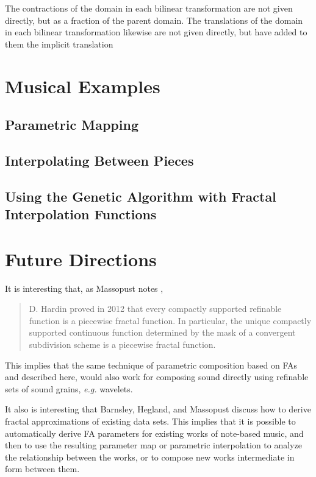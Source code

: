 \documentclass[english,11pt,letterpaper,onecolumn]{scrartcl}
\numberwithin{equation}{section}
\begin{document}
The contractions of the domain in each bilinear transformation are not given directly, but as a fraction of the
parent domain. The translations of the domain in each bilinear transformation likewise are not given directly,
but have added to them the implicit translation

\section{Musical Examples}

\subsection{Parametric Mapping}


\subsection{Interpolating Between Pieces}


\subsection{Using the Genetic Algorithm with Fractal Interpolation
Functions}

\section{Future Directions}

It is interesting that, as Massopust notes \cite{massopust2017},
\begin{quote}D. Hardin proved in 2012 that every compactly supported
refinable function is a piecewise fractal function. In particular, the
unique
compactly supported continuous function determined by the mask of a
convergent
subdivision scheme is a piecewise fractal function. \end{quote}
This implies that the same technique of parametric
composition based on FAs and described here, would also work for composing
sound directly using refinable sets of sound grains, \textit{e.g.}
wavelets.

It also is interesting that Barnsley, Hegland, and Massopust
\cite{2013arXiv1309.0972B} discuss how to derive fractal approximations of
existing data sets. This implies that it is possible to automatically
derive
FA parameters for existing works of note-based music, and then to use the
resulting parameter map or parametric interpolation to analyze the
relationship between the works, or to compose new works intermediate in
form
between them.
\end{document}
